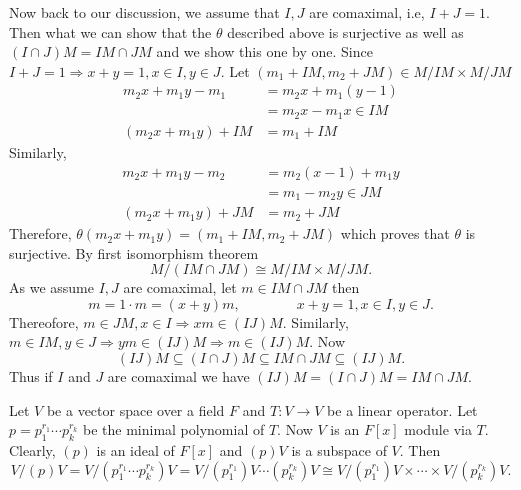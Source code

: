 \documentclass[11pt]{amsart}
\begin{document}
Now back to our discussion, we assume that $I,J$ are comaximal, i.e, $I+J=1.$ Then what we can show that the $\theta$ described above is surjective as well as $(I\cap J)M=IM\cap JM$ and we show this one by one. Since $I+J=1 \Rightarrow x+y=1,x\in I,y\in J.$ Let $(m_1+IM,m_2+JM)\in M/IM\times M/JM$ \begin{align*}
m_2x+m_1y-m_1&=m_2x+m_1(y-1)\\
&=m_2x-m_1x\in IM\\
(m_2x+m_1y)+IM&=m_1+IM
\end{align*} 
Similarly, \begin{align*}
m_2x+m_1y-m_2&=m_2(x-1)+m_1y\\
&=m_1-m_2y\in JM\\
(m_2x+m_1y)+JM&=m_2+JM
\end{align*}
Therefore, $\theta(m_2x+m_1y)=(m_1+IM,m_2+JM)$ which proves that $\theta$ is surjective. By first isomorphism theorem $$M/(IM\cap JM)\cong M/IM\times M/JM.$$
As we assume $I,J$ are comaximal, let $m\in IM\cap JM$ then $$m=1\cdot m=(x+y)m,\qquad\qquad x+y=1,x\in I,y\in J.$$ Thereofore, $m\in JM,x\in I \Rightarrow xm\in (IJ)M$. Similarly, $m\in IM,y\in J \Rightarrow ym\in (IJ)M \Rightarrow m\in (IJ)M.$ Now $$(IJ)M\subseteq (I\cap J)M\subseteq IM\cap JM\subseteq (IJ)M.$$ Thus if $I$ and $J$ are comaximal we have $(IJ)M=(I\cap J)M=IM\cap JM.$

Let $V$ be a vector space over a field $F$ and $T:V\to V$ be a linear operator. Let $p=p_1^{r_1}\cdots p_k^{r_k}$ be the minimal polynomial of $T$. Now $V$ is an $F[x]$ module via $T$. Clearly, $(p)$ is an ideal of $F[x]$ and $(p)V$ is a subspace of $V$. Then $$V/(p)V=V/(p_1^{r_1}\cdots p_k^{r_k})V=V/(p_1^{r_1})V\cdots (p_k^{r_k})V\cong V/(p_1^{r_1})V\times \cdots\times V/(p_k^{r_k})V.$$
\end{document}
